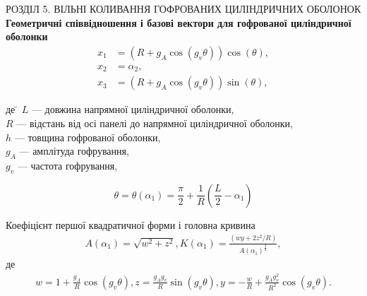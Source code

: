 \documentclass[handout, 8pt]{beamer}
\numberwithin{figure}{section}
\numberwithin{equation}{section}
\numberwithin{table}{section}
\begin{document}
\begin{frame}{РОЗДІЛ 5. ВІЛЬНІ КОЛИВАННЯ ГОФРОВАНИХ ЦИЛІНДРИЧНИХ ОБОЛОНОК}
\textbf{Геометричні співвідношення і базові вектори для гофрованої циліндричної оболонки}
\\
\begin{equation}
\begin{aligned}
x_1&=\left(R + g_{A}\cos\left(g_v\theta\right) \right)\cos\left(\theta\right), \\
x_2&=\alpha_2,\\
x_3&=\left(R + g_{A}\cos\left(g_v\theta\right) \right)\sin\left(\theta\right), 
\end{aligned}
\end{equation}

\begin{tabbing}
де \= $L$ --- довжина напрямної циліндричної оболонки,\\
\> $R$ --- відстань від осі панелі до напрямної циліндричної оболонки,\\
\> $h$ --- товщина гофрованої оболонки,\\
\> $g_A$ --- амплітуда гофрування,\\
\> $g_v$ --- частота гофрування,\\
\end{tabbing}
\[
\theta=\theta\left(\alpha_1\right)=\frac{\pi}{2}+\frac{1}{R}\left(\frac{L}{2}-\alpha_1\right)\]

Коефіцієнт першої квадратичної форми і головна кривина 
\begin{gather}
A\left(\alpha_1\right) = \sqrt{w^2+z^2},
K\left(\alpha_1\right) = \frac{\left(wy+2z^2/R\right)}{A\left(\alpha_1\right)^{\frac{3}{2}}},
\end{gather}
де
\begin{gather*}
w=1+\frac{g_A}{R}\cos\left(g_v\theta\right),
z=\frac{g_A g_v}{R}\sin\left(g_v\theta\right),
y=-\frac{w}{R}+\frac{g_A g_v^2}{R^2}\cos\left(g_v\theta\right).
\end{gather*}

\end{frame}
\end{document}
